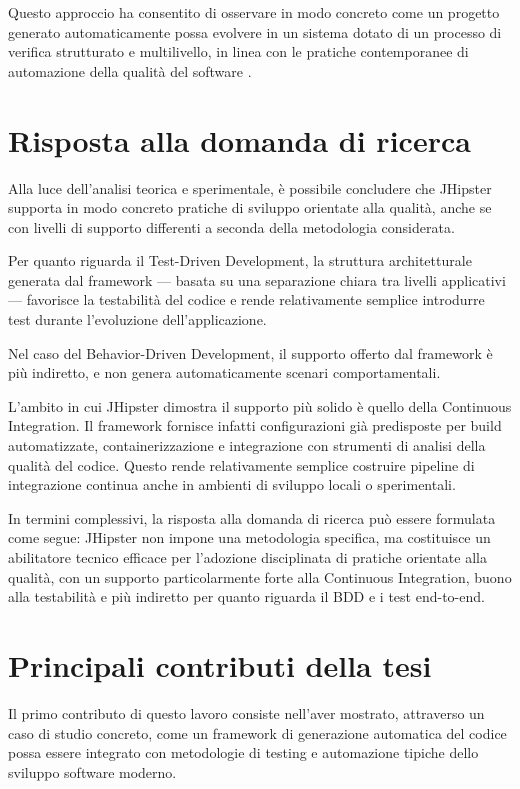 Questo approccio ha consentito di osservare in modo concreto come un progetto generato automaticamente possa evolvere in un sistema dotato di un processo di verifica strutturato e multilivello, in linea con le pratiche contemporanee di automazione della qualità del software \cite{BettiniTDD}.

\section{Risposta alla domanda di ricerca}

Alla luce dell’analisi teorica e sperimentale, è possibile concludere che JHipster supporta in modo concreto pratiche di sviluppo orientate alla qualità, anche se con livelli di supporto differenti a seconda della metodologia considerata.

Per quanto riguarda il Test-Driven Development, la struttura architetturale generata dal framework — basata su una separazione chiara tra livelli applicativi — favorisce la testabilità del codice e rende relativamente semplice introdurre test durante l'evoluzione dell'applicazione.

Nel caso del Behavior-Driven Development, il supporto offerto dal framework è più indiretto, e non genera automaticamente scenari comportamentali. 

L'ambito in cui JHipster dimostra il supporto più solido è quello della Continuous Integration. Il framework fornisce infatti configurazioni già predisposte per build automatizzate, containerizzazione e integrazione con strumenti di analisi della qualità del codice. Questo rende relativamente semplice costruire pipeline di integrazione continua anche in ambienti di sviluppo locali o sperimentali.

In termini complessivi, la risposta alla domanda di ricerca può essere formulata come segue: JHipster non impone una metodologia specifica, ma costituisce un abilitatore tecnico efficace per l’adozione disciplinata di pratiche orientate alla qualità, con un supporto particolarmente forte alla Continuous Integration, buono alla testabilità e più indiretto per quanto riguarda il BDD e i test end-to-end.

\section{Principali contributi della tesi}

Il primo contributo di questo lavoro consiste nell'aver mostrato, attraverso un caso di studio concreto, come un framework di generazione automatica del codice possa essere integrato con metodologie di testing e automazione tipiche dello sviluppo software moderno.

